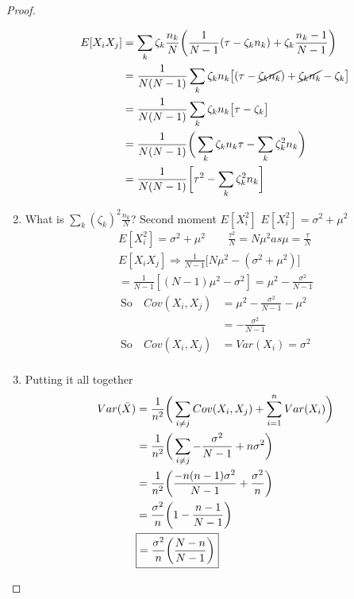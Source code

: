 \begin{proof}
\begin{enumerate}[label=\protect\circled{\arabic*}]
	\begin{align*}
		E[X_i X_j] & = \sum_k \zeta_k \frac{n_k}{N} \bigg( \frac{1}{N-1} (\tau - \zeta_k n_k) + \zeta_k \frac{n_k - 1}{N-1} \bigg)\\
		& = \frac{1}{N(N-1)} \sum_k \zeta_k n_k \big[ (\tau - \cancel{\zeta_k n_k}) + \cancel{\zeta_k n_k} - \zeta_k \big]\\
		& = \frac{1}{N(N-1)} \sum_k \zeta_k n_k \big[\tau - \zeta_k \big]\\
		& = \frac{1}{N(N-1)} \bigg( \sum_k \zeta_k n_k \tau - \sum_k \zeta_k^2 n_k \bigg)\\
		& = \frac{1}{N(N-1)} \bigg[ \tau^2 - \sum_k \zeta_k^2 n_k \bigg]
	\end{align*}
	\item What is $\sum\limits_k (\zeta_k)^2 \frac{n_k}{N}$? Second moment $E[X_i^2]$ \qquad $E[X_i^2] = \sigma^2 + \mu^2$
	\begin{gather*}
		E[X_i^2] = \sigma^2 + \mu^2 \qquad \frac{\tau^2}{N} = N\mu^2 as \mu = \frac{\tau}{N}\\
		E[X_i X_j] \Longrightarrow \frac{1}{N-1} \bigg[N\mu^2 - (\sigma^2 + \mu^2) \bigg]\\
		 = \frac{1}{N-1}[(N-1)\mu^2 - \sigma^2] = \mu^2 - \frac{\sigma^2}{N-1}
	\end{gather*}
	\begin{align*}
		\text{So} \quad Cov(X_i, X_j) & = \mu^2 - \frac{\sigma^2}{N-1} - \mu^2\\
		& = -\frac{\sigma^2}{N-1} \tag{Cov $< 0$}\\
		\text{So} \quad Cov(X_i, X_j) & = Var(X_i) = \sigma^2\\
	\end{align*}
	\item Putting it all together
	\begin{align*}
		Var(\bar{X}) & = \frac{1}{n^2} \bigg(\sum_{i\neq j} Cov(X_i, X_j) + \sum_{i=1}^n Var(X_i) \bigg)\\
		& = \frac{1}{n^2} \bigg(\sum_{i\neq j} -\frac{\sigma^2}{N-1} + n\sigma^2 \bigg)\\
		& = \frac{1}{n^2} \bigg(\frac{-n(n-1)\sigma^2}{N-1} + \frac{\sigma^2}{n} \bigg)\\
		& = \frac{\sigma^2}{n} \bigg(1 - \frac{n-1}{N-1} \bigg)\\
		& \boxed{ = \frac{\sigma^2}{n} \bigg(\frac{N-n}{N-1} \bigg)}
	\end{align*}
\end{enumerate}
\end{proof}
 